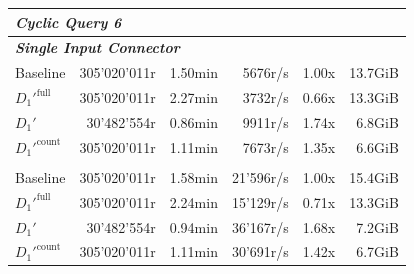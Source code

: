 \begin{longtable}{lrrrrr}
    \multicolumn{6}{l}{\textit{Cyclic Query 6}} \\
    \midrule
    \multicolumn{6}{l}{\textit{\textbf{Single Input Connector}}} \\
    \nopagebreak
    Baseline              &  305'020'011r         &  1.50min            &  5676r/s              & 1.00x             & 13.7GiB   \\
    $D_1'^{\text{full}}$   &  305'020'011r         &  2.27min            &  3732r/s              & 0.66x             & 13.3GiB   \\
    \quad $D_1'$           &  30'482'554r          &  0.86min            &  9911r/s              & 1.74x             & 6.8GiB    \\
    $D_1'^{\text{count}}$  &  305'020'011r         &  1.11min            &  7673r/s              & 1.35x             & 6.6GiB   \\
    \addlinespace 
    
    \multicolumn{6}{l}{\textit{\textbf{4 Input Connectors}}} \\
    \nopagebreak
    Baseline              &  305'020'011r         &  1.58min            &  21'596r/s            & 1.00x             & 15.4GiB   \\
    $D_1'^{\text{full}}$   &  305'020'011r         &  2.24min            &  15'129r/s            & 0.71x             & 13.3GiB   \\
    \quad $D_1'$           &  30'482'554r          &  0.94min            &  36'167r/s            & 1.68x             & 7.2GiB    \\ 
    $D_1'^{\text{count}}$  &  305'020'011r         &  1.11min            &  30'691r/s            & 1.42x             & 6.7GiB   \\

    \bottomrule

\end{longtable}

